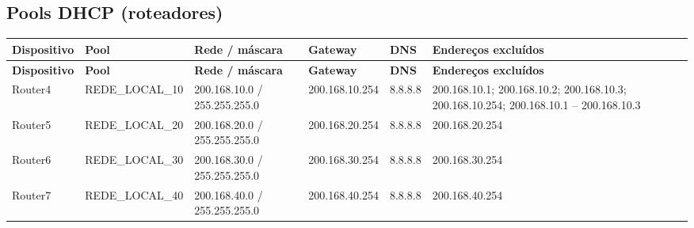 \subsection{Pools DHCP (roteadores)}
\begingroup\scriptsize\setlength{\tabcolsep}{3pt}
\begin{longtable}{@{}p{}p{}p{}p{}p{}p{}@{}}
\toprule \textbf{Dispositivo} & \textbf{Pool} & \textbf{Rede / máscara} & \textbf{Gateway} & \textbf{DNS} & \textbf{Endereços excluídos} \\\midrule\endfirsthead
\toprule \textbf{Dispositivo} & \textbf{Pool} & \textbf{Rede / máscara} & \textbf{Gateway} & \textbf{DNS} & \textbf{Endereços excluídos} \\\midrule\endhead
Router4 & REDE\_LOCAL\_10 & 200.168.10.0 / 255.255.255.0 & 200.168.10.254 & 8.8.8.8 & 200.168.10.1; 200.168.10.2; 200.168.10.3; 200.168.10.254; 200.168.10.1 – 200.168.10.3 \\
Router5 & REDE\_LOCAL\_20 & 200.168.20.0 / 255.255.255.0 & 200.168.20.254 & 8.8.8.8 & 200.168.20.254 \\
Router6 & REDE\_LOCAL\_30 & 200.168.30.0 / 255.255.255.0 & 200.168.30.254 & 8.8.8.8 & 200.168.30.254 \\
Router7 & REDE\_LOCAL\_40 & 200.168.40.0 / 255.255.255.0 & 200.168.40.254 & 8.8.8.8 & 200.168.40.254 \\
\bottomrule
\end{longtable}\endgroup
